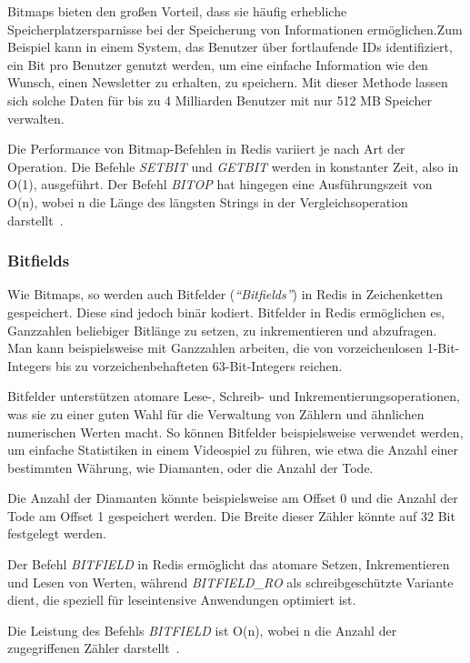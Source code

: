 Bitmaps bieten den großen Vorteil, dass sie häufig erhebliche Speicherplatzersparnisse bei der Speicherung von Informationen ermöglichen.Zum Beispiel kann in einem System, das Benutzer über fortlaufende IDs identifiziert, ein Bit pro Benutzer genutzt werden, um eine einfache Information wie den Wunsch, einen Newsletter zu erhalten, zu speichern. Mit dieser Methode lassen sich solche Daten für bis zu 4 Milliarden Benutzer mit nur 512 MB Speicher verwalten.

Die Performance von Bitmap-Befehlen in Redis variiert je nach Art der Operation. Die Befehle \emph{SETBIT} und \emph{GETBIT} werden in konstanter Zeit, also in O(1), ausgeführt. Der Befehl \emph{BITOP} hat hingegen eine Ausführungszeit von O(n), wobei n die Länge des längsten Strings in der Vergleichsoperation darstellt~\cite{redis_ltd_bitmaps_nodate}.


\subsubsection{Bitfields}
Wie Bitmaps, so werden auch Bitfelder (\emph{\enquote{Bitfields}}) in Redis in Zeichenketten gespeichert. Diese sind jedoch binär kodiert. Bitfelder in Redis ermöglichen es, Ganzzahlen beliebiger Bitlänge zu setzen, zu inkrementieren und abzufragen. Man kann beispielsweise mit Ganzzahlen arbeiten, die von vorzeichenlosen 1-Bit-Integers bis zu vorzeichenbehafteten 63-Bit-Integers reichen.

Bitfelder unterstützen atomare Lese-, Schreib- und Inkrementierungsoperationen, was sie zu einer guten Wahl für die Verwaltung von Zählern und ähnlichen numerischen Werten macht. So können Bitfelder beispielsweise verwendet werden, um einfache Statistiken in einem Videospiel zu führen, wie etwa die Anzahl einer bestimmten Währung, wie Diamanten, oder die Anzahl der Tode.

Die Anzahl der Diamanten könnte beispielsweise am Offset 0 und die Anzahl der Tode am Offset 1 gespeichert werden. Die Breite dieser Zähler könnte auf 32 Bit festgelegt werden.

Der Befehl \emph{BITFIELD} in Redis ermöglicht das atomare Setzen, Inkrementieren und Lesen von Werten, während \emph{BITFIELD\_RO} als schreibgeschützte Variante dient, die speziell für leseintensive Anwendungen optimiert ist.


Die Leistung des Befehls \emph{BITFIELD} ist O(n), wobei n die Anzahl der zugegriffenen Zähler darstellt~\cite{redis_ltd_bitfields_nodate}.


